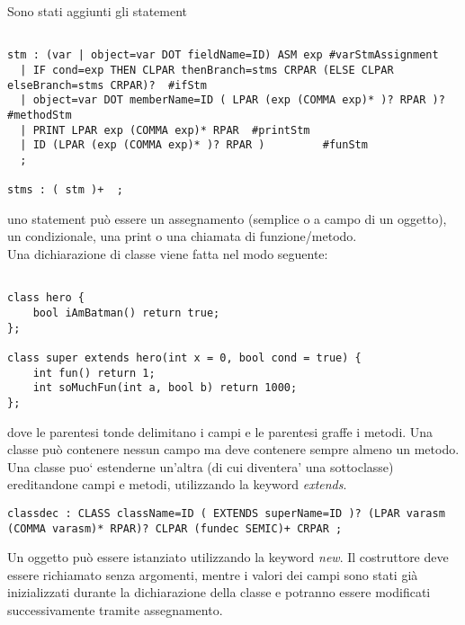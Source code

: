 \documentclass[a4paper]{article}   %
\begin{document}
Sono stati aggiunti gli statement\\

\begin{lstlisting}

stm : (var | object=var DOT fieldName=ID) ASM exp #varStmAssignment
  | IF cond=exp THEN CLPAR thenBranch=stms CRPAR (ELSE CLPAR elseBranch=stms CRPAR)?  #ifStm
  | object=var DOT memberName=ID ( LPAR (exp (COMMA exp)* )? RPAR )?  #methodStm
  | PRINT LPAR exp (COMMA exp)* RPAR  #printStm
  | ID (LPAR (exp (COMMA exp)* )? RPAR )         #funStm
  ;

stms : ( stm )+  ;

\end{lstlisting}

uno statement può essere un assegnamento (semplice o a campo di un oggetto), un condizionale, una print
o una chiamata di funzione/metodo.\\
\newpage
Una dichiarazione di classe viene fatta nel modo seguente:\\

\begin{lstlisting}

class hero {
    bool iAmBatman() return true;
};

class super extends hero(int x = 0, bool cond = true) {
    int fun() return 1;
    int soMuchFun(int a, bool b) return 1000;
};
\end{lstlisting}

dove le parentesi tonde delimitano i campi e le parentesi graffe i metodi. Una classe può contenere nessun campo
ma deve contenere sempre almeno un metodo. Una classe puo` estenderne un'altra (di cui diventera' una sottoclasse)
ereditandone campi e metodi, utilizzando la keyword \textit{extends}.\\

\begin{lstlisting}
classdec : CLASS className=ID ( EXTENDS superName=ID )? (LPAR varasm (COMMA varasm)* RPAR)? CLPAR (fundec SEMIC)+ CRPAR ;

\end{lstlisting}

Un oggetto può essere istanziato utilizzando la keyword \textit{new}. Il costruttore deve essere richiamato senza argomenti, mentre i valori dei campi
sono stati già inizializzati durante la dichiarazione della classe e potranno essere modificati successivamente
tramite assegnamento.\\
\end{document}
